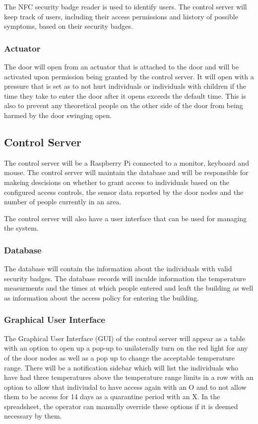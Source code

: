 The NFC security badge reader is used to identify users. The control server will
keep track of users, including their access permissions and history of possible
symptoms, based on their security badges.

\subsubsection{Actuator}
The door will open from an actuator that is attached to the door and will be
activated upon permission being granted by the control server. It will open with a
pressure that is set as to not hurt individuals or individuals with children if
the time they take to enter the door after it opens exceeds the default time.
This is also to prevent any theoretical people on the other side of the door
from being harmed by the door swinging open.

\subsection{Control Server}
The control server will be a Raspberry Pi connected to a monitor, keyboard and
mouse. The control server will maintain the database and will be responsible for
makeing descisions on whether to grant access to individuals based on the
configured access controls, the sensor data reported by the door nodes and the 
number of people currently in an area. 

The control server will also have a user interface that can be used for managing
the system.

\subsubsection{Database}
The database will contain the information about the individuals with valid
security badges. The database records will inculde information the temperature
measurments and the times at which people entered and leaft the building as well
as information about the access policy for entering the building.

\subsubsection{Graphical User Interface}
The Graphical User Interface (GUI) of the control server will appear as a table
with an option to open up a pop-up to unilaterally turn on the red light for any
of the door nodes as well as a pop up to change the acceptable temperature
range. There will be a notification sidebar which will list the individuals who
have had three temperatures above the temperature range limits in a row with an
option to allow that indiviudal to have access again with an O and to not allow
them to be access for 14 days as a quarantine period with an X. In the
spreadsheet, the operator can manually override these options if it is deemed
necessary by them.


